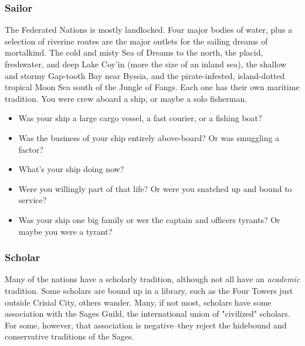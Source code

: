\subsubsection{Sailor}

The Federated Nations is mostly landlocked. Four major bodies of water, plus a selection of riverine routes are the major outlets for the sailing dreams of mortalkind. The cold and misty Sea of Dreams to the north, the placid, freshwater, and deep Lake Coy'in (more the size of an inland sea), the shallow and stormy Gap-tooth Bay near Byssia, and the pirate-infested, island-dotted tropical Moon Sea south of the Jungle of Fangs. Each one has their own maritime tradition. You were crew aboard a ship, or maybe a solo fisherman.

\begin{itemize}
	\item Was your ship a large cargo vessel, a fast courier, or a fishing boat?
	\item Was the business of your ship entirely above-board? Or was smuggling a factor?
	\item What's your ship doing now?
	\item Were you willingly part of that life? Or were you snatched up and bound to service?
	\item Was your ship one big family or wer the captain and officers tyrants? Or maybe you were a tyrant?
\end{itemize}

\subsubsection{Scholar}

Many of the nations have a scholarly tradition, although not all have an \textit{academic} tradition. Some scholars are bound up in a library, such as the Four Towers just outside Crisial City, others wander. Many, if not most, scholars have some association with the Sages Guild, the international union of "civilized" scholars. For some, however, that association is negative--they reject the hidebound and conservative traditions of the Sages.

